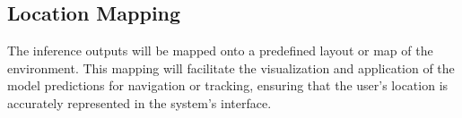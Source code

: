 \begin{refsection}
\subsection{Location Mapping}

The inference outputs will be mapped onto a predefined layout or map of the environment. This mapping will facilitate the visualization and application of the model predictions for navigation or tracking, ensuring that the user’s location is accurately represented in the system’s interface.

\clearpage

\printbibliography[heading=subbibintoc, title={\centering Notes}]
\end{refsection}